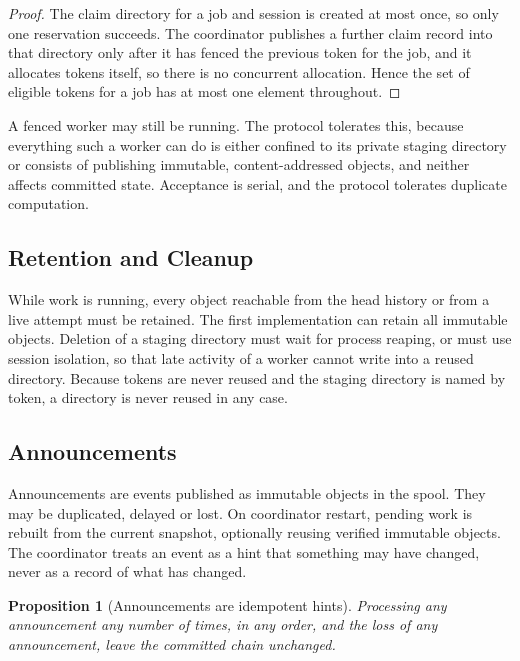 \documentclass[11pt,a4paper]{article}
\theoremstyle{plain}
\newtheorem{proposition}[theorem]{Proposition}
\theoremstyle{definition}
\theoremstyle{remark}
\theoremstyle{definition}
\begin{document}
\begin{proof}
The claim directory for a job and session is created at most once, so only one reservation succeeds. The coordinator publishes a further claim record into that directory only after it has fenced the previous token for the job, and it allocates tokens itself, so there is no concurrent allocation. Hence the set of eligible tokens for a job has at most one element throughout.
\end{proof}

A fenced worker may still be running. The protocol tolerates this, because everything such a worker can do is either confined to its private staging directory or consists of publishing immutable, content-addressed objects, and neither affects committed state. Acceptance is serial, and the protocol tolerates duplicate computation.

\subsection{Retention and Cleanup}

While work is running, every object reachable from the head history or from a live attempt must be retained. The first implementation can retain all immutable objects. Deletion of a staging directory must wait for process reaping, or must use session isolation, so that late activity of a worker cannot write into a reused directory. Because tokens are never reused and the staging directory is named by token, a directory is never reused in any case.

\subsection{Announcements}

Announcements are events published as immutable objects in the spool. They may be duplicated, delayed or lost. On coordinator restart, pending work is rebuilt from the current snapshot, optionally reusing verified immutable objects. The coordinator treats an event as a hint that something may have changed, never as a record of what has changed.

\begin{proposition}[Announcements are idempotent hints]
\label{prop:dup}
Processing any announcement any number of times, in any order, and the loss of any announcement, leave the committed chain unchanged.
\end{proposition}
\end{document}
